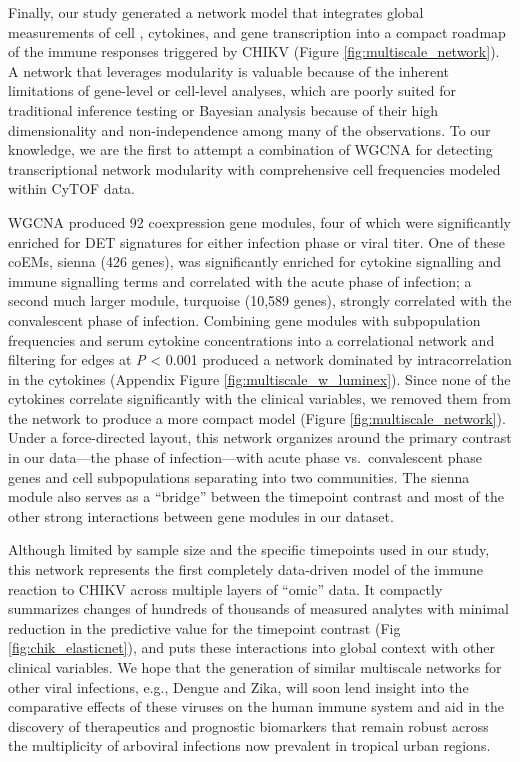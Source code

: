 Finally, our study generated a network model that integrates global measurements of cell \subcommunities{}, cytokines, and gene transcription into a compact roadmap of the immune responses triggered by CHIKV (Figure \ref{fig:multiscale_network}). A network that leverages modularity is valuable because of the inherent limitations of gene-level or cell-level analyses, which are poorly suited for traditional inference testing or Bayesian analysis because of their high dimensionality and non-independence among many of the observations. To our knowledge, we are the first to attempt a combination of WGCNA for detecting transcriptional network modularity with comprehensive cell \subcommunity{} frequencies modeled within CyTOF data. 

WGCNA produced 92 coexpression gene modules, four of which were significantly enriched for DET signatures for either infection phase or viral titer. One of these coEMs, sienna (426 genes), was significantly enriched for cytokine signalling and immune signalling terms and correlated with the acute phase of infection; a second much larger module, turquoise (10,589 genes), strongly correlated with the convalescent phase of infection. Combining gene modules with subpopulation frequencies and serum cytokine concentrations into a correlational network and filtering for edges at \emph{P} < 0.001 produced a network dominated by intracorrelation in the cytokines (Appendix Figure \ref{fig:multiscale_w_luminex}). Since none of the cytokines correlate significantly with the clinical variables, we removed them from the network to produce a more compact model (Figure \ref{fig:multiscale_network}). Under a force-directed layout, this network organizes around the primary contrast in our data—the phase of infection—with acute phase vs.\ convalescent phase genes and cell subpopulations separating into two communities. The sienna module also serves as a “bridge” between the timepoint contrast and most of the other strong interactions between gene modules in our dataset.

Although limited by sample size and the specific timepoints used in our study, this network represents the first completely data-driven model of the immune reaction to CHIKV across multiple layers of “omic” data. It compactly summarizes changes of hundreds of thousands of measured analytes with minimal reduction in the predictive value for the timepoint contrast (Fig \ref{fig:chik_elasticnet}), and puts these interactions into global context with other clinical variables. We hope that the generation of similar multiscale networks for other viral infections, e.g., Dengue and Zika, will soon lend insight into the comparative effects of these viruses on the human immune system and aid in the discovery of therapeutics and prognostic biomarkers that remain robust across the multiplicity of arboviral infections now prevalent in tropical urban regions.

